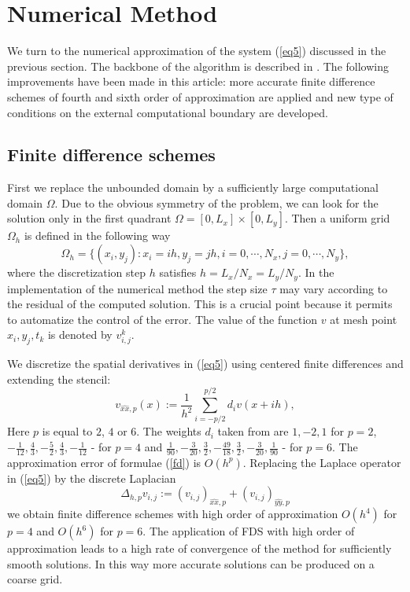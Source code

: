 \documentclass[preprint]{elsarticle}
\newcommand{\rf}[1]{(\ref{#1})}
\begin{document}
\section{Numerical Method}

We  turn  to the numerical approximation of the   system \rf{eq5} discussed in the previous section. The backbone of the  algorithm is  described in \cite{Ch2012}. The following  improvements have been made in this article:   more accurate finite difference schemes of fourth and sixth order of approximation are applied and new type of  conditions on the external computational boundary are developed.

\subsection{Finite difference schemes}
First we replace the unbounded domain by a sufficiently large computational domain $\Omega$. Due to the obvious symmetry of the problem, we can look for the solution only in the first quadrant $\Omega = [0,L_x] \times[0,L_y]$. Then a uniform grid $\Omega_h$ is defined in the following way
$$
\Omega_h = \{(x_i,y_j): x_i = ih, y_j = jh, i = 0,\cdots ,N_x, j = 0,\cdots , N_y \},
$$
where the discretization step $h$ satisfies
$ h = L_x/N_x = L_y/N_y$. 
 In the  implementation of the numerical method
the  step size $\tau$ may vary according to the residual of the computed solution. This is a crucial point because it permits  to automatize the control of the error.
The value of the function $v$ at mesh point $x_i,y_j,t_k$ is denoted by $v_{i,j}^k$.

We discretize the spatial  derivatives in \rf{eq5} using centered finite differences  
and extending the stencil:
\begin{equation}\label{fd}
v_{\widehat{xx},p}(x) :=  \frac{1}{h^2} \sum\limits_{i=-p/2}^{p/2} d_i v(x+ih),
\end{equation}
 Here $p$ is equal to $2$, $4$ or $6$.  The weights $d_i$ taken from  \cite{forn} are  
 $ 1,-2,1$ for $p=2$, $-\frac{1}{12}, \frac{4}{3}, -\frac{5}{2}, \frac{4}{3}, -\frac{1}{12}$ - for $p=4$ and  $\frac{1}{90}, -\frac{3}{20}, \frac{3}{2}, -\frac{49}{18}, \frac{3}{2}, -\frac{3}{20}, \frac{1}{90}$ - for $p=6$. The approximation error of  formulae \rf{fd} is $O(h^p)$. Replacing the Laplace operator in \rf{eq5} by the discrete Laplacian $$ \Delta_{h,p} v_{i,j} := (v_{i,j})_{\widehat{xx},p} + (v_{i,j})_{\widehat{yy},p}$$ we obtain finite difference schemes with high order of approximation $O(h^4)$ for $p=4$ and  $O(h^6)$ for $p=6 $.  The application of FDS with high order of approximation leads to a high rate of convergence of the method for   sufficiently smooth solutions.
In this way more accurate solutions can be produced on a coarse grid.
\end{document}
